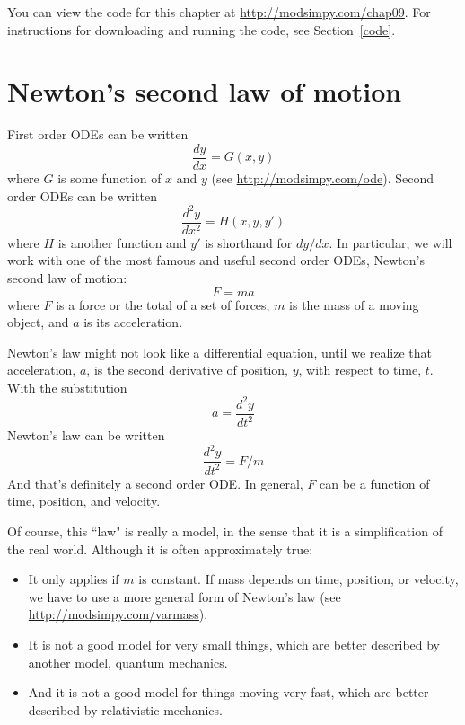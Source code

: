 \documentclass[12pt]{book}
\theoremstyle{exercise}
\begin{document}
You can view the code for this chapter at \url{http://modsimpy.com/chap09}.  For instructions for downloading and running the code, see Section~\ref{code}.


\section{Newton's second law of motion}

First order ODEs can be written
%
\[ \frac{dy}{dx} = G(x, y) \]
%
where $G$ is some function of $x$ and $y$ (see \url{http://modsimpy.com/ode}).  Second order ODEs can be written
%
\[ \frac{d^2y}{dx^2} = H(x, y, y') \]
%
where $H$ is another function and $y'$ is shorthand for $dy/dx$.  In particular, we will work with one of the most famous and useful second order ODEs, Newton's second law of motion:
%
\[ F = m a \]
%
where $F$ is a force or the total of a set of forces, $m$ is the mass of a moving object, and $a$ is its acceleration.

Newton's law might not look like a differential equation, until we realize that acceleration, $a$, is the second derivative of position, $y$, with respect to time, $t$.  With the substitution
%
\[ a = \frac{d^2y}{dt^2} \]
%
Newton's law can be written
%
\[ \frac{d^2y}{dt^2} = F / m \]
%
And that's definitely a second order ODE.  In general, $F$ can be a function of time, position, and velocity.

Of course, this ``law" is really a model, in the sense that it is a simplification of the real world.  Although it is often approximately true:

\begin{itemize}

\item It only applies if $m$ is constant.  If mass depends on time, position, or velocity, we have to use a more general form of Newton's law (see \url{http://modsimpy.com/varmass}).

\item It is not a good model for very small things, which are better described by another model, quantum mechanics.

\item And it is not a good model for things moving very fast, which are better described by relativistic mechanics.

\end{itemize}
\end{document}
